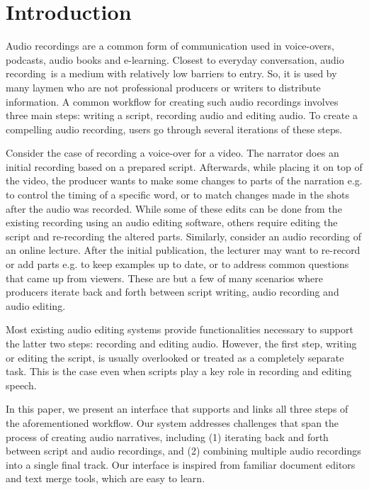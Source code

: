 \section{Introduction}
Audio recordings are a common form of communication used in voice-overs, podcasts, audio books and e-learning. Closest to everyday conversation, audio recording\ is a medium with relatively low barriers to entry. So, it is used by many laymen who are not professional producers or writers to distribute information. A common workflow for creating such audio recordings involves three main steps: writing a script, recording audio and editing audio. To create a compelling audio recording, users go through several iterations of these steps.  

Consider the case of recording a voice-over for a video. The narrator does an initial recording based on a prepared script. Afterwards, while placing it on top of the video, the producer wants to make some changes to parts of the narration e.g. to control the timing of a specific word, or to match changes made in the shots after the audio was recorded. While some of these edits can be done from the existing recording using an audio editing software, others require editing the script and re-recording the altered parts. Similarly, consider an audio recording of an online lecture. After the initial publication, the lecturer may want to re-record or add parts e.g. to keep examples up to date, or to address common questions that came up from viewers. These are but a few of many scenarios where producers iterate back and forth between script writing, audio recording and audio editing.

Most existing audio editing systems provide functionalities necessary
to support the latter two steps: recording and editing audio.
However, the first step, writing or editing the script, is usually overlooked
or treated as a completely separate task. This is the case even
when scripts play a key role in recording and editing speech.
  

In this paper, we present an interface that supports and links all three steps of the aforementioned workflow. Our system addresses challenges that span the process of creating audio narratives, including (1) iterating back and forth between script  and audio recordings, and (2) combining multiple audio recordings into a single final track. Our interface is inspired from familiar document editors and text merge tools, which are easy to learn.

